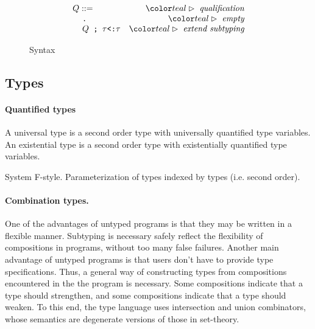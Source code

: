 \documentclass[sigplan,screen,review]{acmart}
\begin{document}
\begin{figure*}[h]
\[\begin{array}[t]{l r}
  Q ::= &\C{qualification}
  \\
  \I \code{.} &\C{empty}
  \\
  \I \code{$Q$ ; $\tau$<:$\tau$} &\C{extend subtyping}
  \\
\end{array}
\]

\caption{Syntax}
\label{fig:syntax}
\end{figure*}



\subsection{Types}

\paragraph{Quantified types}
A universal type is a second order type with universally quantified type variables. 
An existential type is a second order type with existentially quantified type variables. 

System F-style. Parameterization of types indexed by types (i.e. second order).


\paragraph{Combination types.}
One of the advantages of untyped programs is that they may be written in a flexible manner.
Subtyping is necessary safely reflect the flexibility of compositions in programs, without too many false failures.
Another main advantage of untyped programs is that users don't have to provide type specifications.
Thus, a general way of constructing types from compositions encountered in the the program is necessary.
Some compositions indicate that a type should strengthen, and some compositions indicate that a type should weaken.
To this end, the type language uses intersection and union combinators, 
whose semantics are degenerate versions of those in set-theory.
\end{document}
